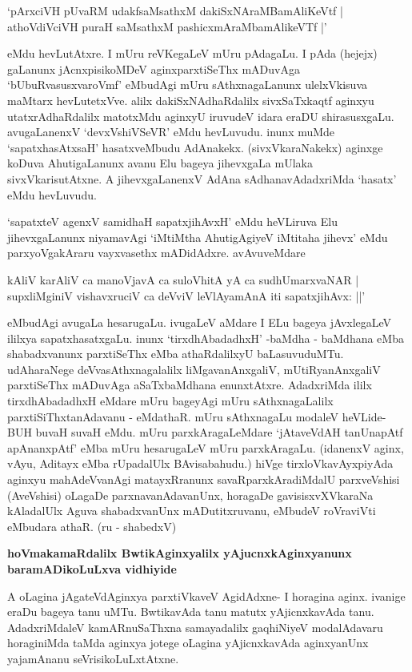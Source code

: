 \begin{shloka}
`pArxciVH pUvaRM udakfsaMsathxM dakiSxNAraMBamAliKeVtf |\\
athoVdiVciVH puraH saMsathxM pashicxmAraMbamAlikeVTf |'
\end{shloka}

eMdu hevLutAtxre. I mUru reVKegaLeV mUru pAdagaLu. I pAda (hejejx) gaLanunx jAcnxpisikoMDeV aginxparxtiSeThx mADuvAga `bUbuRvasusxvaroVmf' eMbudAgi mUru sAthxnagaLanunx ulelxVkisuva maMtarx hevLutetxVve. alilx dakiSxNAdhaRdalilx sivxSaTxkaqtf aginxyu utatxrAdhaRdalilx matotxMdu aginxyU iruvudeV idara eraDU shirasusxgaLu. avugaLanenxV `devxVshiVSeVR' eMdu hevLuvudu. inunx muMde `sapatxhasAtxsaH' hasatxveMbudu AdAnakekx. (sivxVkaraNakekx) aginxge koDuva AhutigaLanunx avanu Elu bageya jihevxgaLa mUlaka sivxVkarisutAtxne. A jihevxgaLanenxV AdAna sAdhanavAdadxriMda `hasatx' eMdu hevLuvudu.

`sapatxteV agenxV samidhaH sapatxjihAvxH' eMdu heVLiruva Elu jihevxgaLanunx niyamavAgi `iMtiMtha AhutigAgiyeV iMtitaha jihevx' eMdu parxyoVgakAraru vayxvasethx mADidAdxre. avAvuveMdare

\begin{shloka}
kAliV karAliV ca manoVjavA ca suloVhitA yA ca sudhUmarxvaNAR |\\
supxliMginiV vishavxruciV ca deVviV leVlAyamAnA iti sapatxjihAvx: ||'
\end{shloka}

eMbudAgi avugaLa hesarugaLu. ivugaLeV aMdare I ELu bageya jAvxlegaLeV ililxya sapatxhasatxgaLu. inunx `tirxdhAbadadhxH' -baMdha - baMdhana eMba shabadxvanunx parxtiSeThx eMba athaRdalilxyU baLasuvuduMTu. udAharaNege deVvasAthxnagalalilx liMgavanAnxgaliV, mUtiRyanAnxgaliV parxtiSeThx mADuvAga aSaTxbaMdhana enunxtAtxre. AdadxriMda ililx tirxdhAbadadhxH eMdare mUru bageyAgi mUru sAthxnagaLalilx parxtiSiThxtanAdavanu - eMdathaR. mUru sAthxnagaLu modaleV heVLide- BUH buvaH suvaH eMdu. mUru parxkAragaLeMdare `jAtaveVdAH tanUnapAtf apAnanxpAtf' eMba mUru hesarugaLeV mUru parxkAragaLu. (idanenxV aginx, vAyu, Aditayx eMba rUpadalUlx BAvisabahudu.) hiVge tirxloVkavAyxpiyAda aginxyu mahAdeVvanAgi matayxRranunx savaRparxkAradiMdalU parxveVshisi (AveVshisi) oLagaDe parxnavanAdavanUnx, horagaDe gavisisxvXVkaraNa kAladalUlx Aguva shabadxvanUnx mADutitxruvanu, eMbudeV roVraviVti eMbudara athaR. (ru - shabedxV)

{\bf hoVmakamaRdalilx BwtikAginxyalilx yAjucnxkAginxyanunx baramADikoLuLxva vidhiyide}

A oLagina jAgateVdAginxya parxtiVkaveV AgidAdxne- I horagina aginx. ivanige eraDu bageya tanu uMTu. BwtikavAda tanu matutx yAjicnxkavAda tanu. AdadxriMdaleV kamARnuSaThxna samayadalilx gaqhiNiyeV modalAdavaru horaginiMda taMda aginxya jotege oLagina yAjicnxkavAda aginxyanUnx yajamAnanu seVrisikoLuLxtAtxne. 

